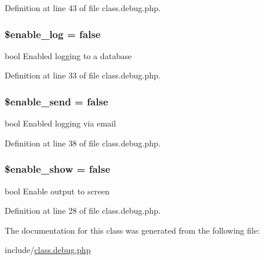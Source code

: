 Definition at line 43 of file class.\-debug.\-php.

\hypertarget{class_debug_abf6da1366fe6b13a73e55c0962433b5f}{
\subsubsection[{\$enable\-\_\-log}]{\setlength{\rightskip}{0pt plus 5cm}\$enable\-\_\-log = false\hspace{0.3cm}{\ttfamily [static]}}}\label{class_debug_abf6da1366fe6b13a73e55c0962433b5f}
bool Enabled logging to a database 

Definition at line 33 of file class.\-debug.\-php.

\hypertarget{class_debug_aeb64a58109ab72544114d51e42a3ca4f}{
\subsubsection[{\$enable\-\_\-send}]{\setlength{\rightskip}{0pt plus 5cm}\$enable\-\_\-send = false\hspace{0.3cm}{\ttfamily [static]}}}\label{class_debug_aeb64a58109ab72544114d51e42a3ca4f}
bool Enabled logging via email 

Definition at line 38 of file class.\-debug.\-php.

\hypertarget{class_debug_a5789d2d16b0d24dc6aa96b63b4f6f605}{
\subsubsection[{\$enable\-\_\-show}]{\setlength{\rightskip}{0pt plus 5cm}\$enable\-\_\-show = false\hspace{0.3cm}{\ttfamily [static]}}}\label{class_debug_a5789d2d16b0d24dc6aa96b63b4f6f605}
bool Enable output to screen 

Definition at line 28 of file class.\-debug.\-php.



The documentation for this class was generated from the following file\-:\begin{DoxyCompactItemize}
\item 
include/\hyperlink{class_8debug_8php}{class.\-debug.\-php}\end{DoxyCompactItemize}

